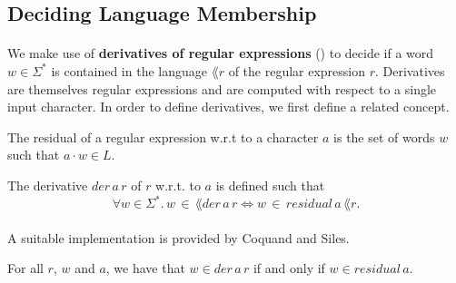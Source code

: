 \documentclass[11pt,a4paper,oneside]{book}
\begin{document}

                 

            \subsection{Deciding Language Membership}
                    \paragraph{}
                        We make use of \textbf{derivatives of regular expressions} (\cite{DBLP:journals/jacm/Brzozowski64}) to decide if a word $w \in \Sigma^*$ is contained in the language $\lang{r}$ of the regular expression $r$. 
                        Derivatives are themselves regular expressions and are computed with respect to a single input character. 
                        In order to define derivatives, we first define a related concept.

                    \begin{definition}{}
                        \label{residual}
                        The residual of a regular expression w.r.t to a character $a$ is the set of words $w$ such that $a \cdot w \in L$.
                    \end{definition}

                    \begin{definition}{}
                        \label{residual}
                        The derivative $der \,  a \, r$ of $r$ w.r.t. to $a$ is defined such that 
                        \[
                            \forall w \in \Sigma^*. \, w \, \in \, \lang{der \, a \, r} \Leftrightarrow w \, \in \, residual \, a \, \lang{r}.
                        \]
                    \end{definition}

                    \paragraph{}
                        A suitable implementation is provided by Coquand and Siles.



                    \begin{theorem}
                        \label{der_correct}
                        For all $r$, $w$ and $a$, we have that $w \in der \, a \, r$ if and only if $w \in residual \, a $.
                    \end{theorem}
\end{document}
